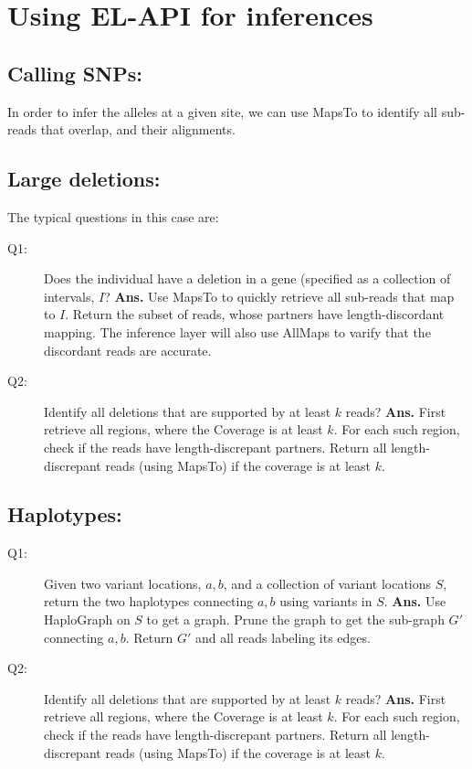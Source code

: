 \documentclass[11pt]{article}
\begin{document}
\section{Using EL-API for inferences}
\subsection{Calling SNPs:}
In order to infer the alleles at a given site, we can use {\sc MapsTo}
to identify all sub-reads that overlap, and their alignments.
\subsection{Large deletions:}
The typical questions in this case are:
\begin{description}
\item [Q1:] Does the individual have a deletion in a gene (specified
  as a collection of intervals, $I$? {\bf Ans.} Use {\sc MapsTo} to
  quickly retrieve all sub-reads that map to $I$. Return the subset of
  reads, whose partners have length-discordant mapping. The inference
  layer will also use {\sc AllMaps} to varify that the discordant
  reads are accurate.
\item [Q2:] Identify all deletions that are supported by at least $k$
  reads? {\bf Ans.} First retrieve all regions, where the {\sc
    Coverage} is at least $k$. For each such region, check if the
  reads have length-discrepant partners. Return all length-discrepant
  reads (using {\sc MapsTo}) if the coverage is at least $k$.
\end{description}

\subsection{Haplotypes:}
\begin{description}
\item [Q1:] Given two variant locations, $a,b$, and a collection of
  variant locations $S$, return the two haplotypes connecting $a,b$
  using variants in $S$. {\bf Ans.} Use {\sc HaploGraph} on $S$ to get
  a graph. Prune the graph to get the sub-graph $G'$ connecting
  $a,b$. Return $G'$ and all reads labeling its edges.

\item [Q2:] Identify all deletions that are supported by at least $k$
  reads? {\bf Ans.} First retrieve all regions, where the {\sc
    Coverage} is at least $k$. For each such region, check if the
  reads have length-discrepant partners. Return all length-discrepant
  reads (using {\sc MapsTo}) if the coverage is at least $k$.
\end{description}
\end{document}
